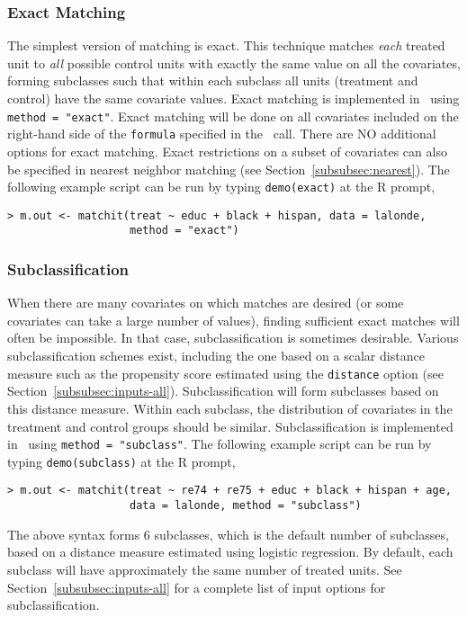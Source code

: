 \subsubsection{Exact Matching}
\label{subsubsec:exact}

The simplest version of matching is exact.  This technique matches
\emph{each} treated unit to \emph{all} possible control units with
exactly the same value on all the covariates, forming subclasses such
that within each subclass all units (treatment and control) have the
same covariate values.  Exact matching is implemented in \MatchIt\ 
using \texttt{method = "exact"}.  Exact matching will be done on all
covariates included on the right-hand side of the \texttt{formula}
specified in the \MatchIt\ call.  There are NO additional options for
exact matching.  Exact restrictions on a subset of covariates can also
be specified in nearest neighbor matching (see
Section~\ref{subsubsec:nearest}).  The following example script can be
run by typing {\tt demo(exact)} at the R prompt,
\begin{verbatim}
> m.out <- matchit(treat ~ educ + black + hispan, data = lalonde, 
                   method = "exact")
\end{verbatim}

\subsubsection{Subclassification}
\label{subsubsec:subclass}

When there are many covariates on which matches are desired (or some
covariates can take a large number of values), finding sufficient
exact matches will often be impossible.  In that case,
subclassification is sometimes desirable. Various subclassification
schemes exist, including the one based on a scalar distance measure
such as the propensity score estimated using the \texttt{distance}
option (see Section~\ref{subsubsec:inputs-all}).  Subclassification
will form subclasses based on this distance measure.  Within each
subclass, the distribution of covariates in the treatment and control
groups should be similar.  Subclassification is implemented in
\MatchIt\ using \texttt{method = "subclass"}.
The following example script can be run by typing {\tt demo(subclass)}
at the R prompt,
\begin{verbatim}
> m.out <- matchit(treat ~ re74 + re75 + educ + black + hispan + age, 
                   data = lalonde, method = "subclass")
\end{verbatim}
The above syntax forms 6 subclasses, which is the default number
of subclasses, based on a distance measure estimated using logistic
regression.  By default, each subclass will have approximately the
same number of treated units.  See
Section~\ref{subsubsec:inputs-all}
for a complete list of input options for subclassification.

